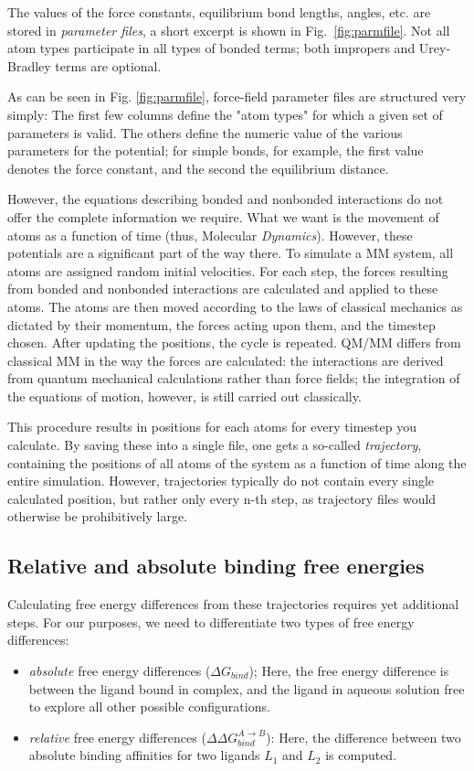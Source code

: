\documentclass[oneside]{scrreprt}
\begin{document}
The values of the force constants, equilibrium bond lengths, angles, etc. are stored in \emph{parameter files}, a short excerpt is shown in Fig.~\ref{fig:parmfile}. Not all atom types participate in all types of bonded terms; both impropers and Urey-Bradley terms are optional.


As can be seen in Fig. \ref{fig:parmfile}, force-field parameter files are structured very simply: The first few columns define the "atom types" for which a given set of parameters is valid. The others define the numeric value of the various parameters for the potential; for simple bonds, for example, the first value denotes the force constant, and the second the equilibrium distance. %

However, the equations describing bonded and nonbonded interactions do not offer the complete information we require. What we want is the movement of atoms as a function of time (thus, Molecular \emph{Dynamics}). However, these potentials are a significant part of the way there. To simulate a MM system, all atoms are assigned  random initial velocities. For each step, the forces resulting from bonded and nonbonded interactions are calculated and applied to these atoms. The atoms are then moved according to the laws of classical mechanics as dictated by their momentum, the forces acting upon them, and the timestep chosen. After updating the positions, the cycle is repeated. QM/MM differs from classical MM in the way the forces are calculated:  the interactions are derived from quantum mechanical calculations rather than force fields; the integration of the equations of motion, however, is still carried out classically.


This procedure results in positions for each atoms for every timestep you calculate. By saving these into a single file, one gets a so-called \emph{trajectory}, containing the positions of all atoms of the system as a function of time along the entire simulation. However, trajectories typically do not contain every single calculated position, but rather only every n-th step, as trajectory files would otherwise be prohibitively large.

\subsection{Relative and absolute binding free energies}

Calculating free energy differences from these trajectories requires yet additional steps. For our purposes, we need to differentiate two types of free energy differences:
\begin{itemize}
    \item \emph{absolute} free energy differences ($\Delta G_{bind}$); Here, the free energy difference is between the ligand bound in complex, and the ligand in aqueous solution free to explore all other possible configurations.
    \item \emph{relative} free energy differences ($\Delta\Delta G^{A\rightarrow B}_{bind}$): Here, the difference between two absolute binding affinities for two ligands $L_1$ and $L_2$ is computed.
\end{itemize}
\end{document}
